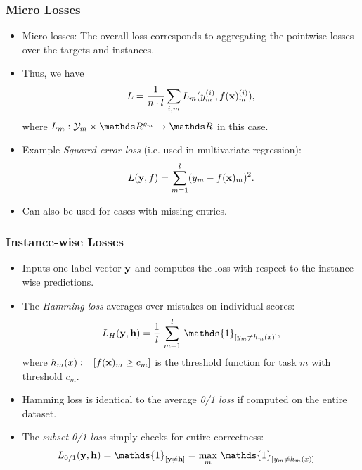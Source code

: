 \documentclass[11pt,compress,t,notes=noshow, xcolor=table]{beamer}
\begin{document}
\begin{frame}
	\frametitle{Micro Losses}
	\begin{itemize}
		

            \item Micro-losses: The overall loss corresponds to aggregating the pointwise losses over the targets and instances.
                    \vspace{5pt}

            \item Thus, we have	
	$$
	L =  \frac{1}{n \cdot l} \sum_{i,m} L_m(y_m^{(i)} , f(\mathbf{x})_m^{(i)}),
	$$
	where $L_m: \Yspace_m \times \R^{g_m} \to \R$ in this case.
                    \vspace{5pt}            
		\item Example \emph{Squared error loss} (i.e. used in multivariate regression):
		$$
		L(\mathbf{y}, f) = \sum_{m=1}^l (y_m - f(\mathbf{x})_m)^2.
		$$
            \item Can also be used for cases with missing entries.

		
	\end{itemize}
\end{frame}

\begin{frame}
	\frametitle{Instance-wise Losses}
	\begin{itemize}
		
            \item Inputs one label vector $\mathbf{y}$ and computes the loss with respect to the instance-wise predictions.
                    \vspace{5pt}            

		\item The \emph{Hamming loss} averages over mistakes on individual scores:    
		$$
		\displaystyle L_H(\yv, \mathbf{h}) = \frac{1}{l}  \, \sum_{m=1}^l \, \mathds{1}_{[y_m \neq h_m(x)]},
		$$
        where $h_m(x) := [f(\mathbf{x})_m \geq c_m]$ is the threshold function for task $m$ with threshold $c_m$. 
        \vspace{5pt}
        \item Hamming loss is identical to the average \emph{0/1 loss} if computed on the entire dataset.
        \vspace{5pt}
		
		\item The \emph{subset 0/1 loss} simply checks for entire correctness:  
		\begin{align*}
			\displaystyle L_{0/1}(\yv, \mathbf{h}) & = \mathds{1}_{[ \yv \neq \mathbf{h} ]}  =  \max_m \, \mathds{1}_{[y_m \neq  h_m(x)]}
		\end{align*}
		
	\end{itemize}
\end{frame}
\end{document}
